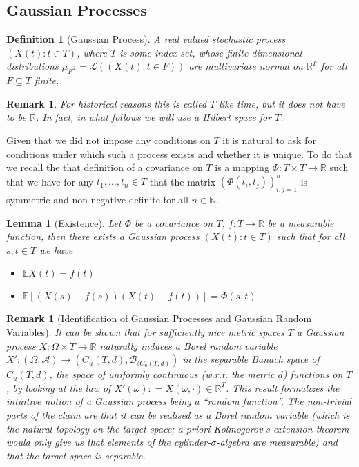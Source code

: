 \documentclass[11pt,reqno]{amsart}
\numberwithin{equation}{section}
\newtheorem{lem}[thm]{Lemma}
\newtheorem{defi}[thm]{Definition}
\newtheorem{rem}[thm]{Remark}
\newcommand{\deq}{\mathrel{\mathop:}=}
\begin{document}
\subsection{Gaussian Processes}

\begin{defi}[Gaussian Process]
	A real valued stochastic process $(X(t):t\in T)$, where $T$ is some index set, whose finite dimensional distributions $\mu_F\deq \mathcal L((X(t):t\in F))$ are multivariate normal on $\mathbb R^F$ for all $F\subseteq T$ finite.
\end{defi}

\begin{rem}
	For historical reasons this is called $T$ like time, but it does not have to be $\mathbb R$. In fact, in what follows we will use a Hilbert space for $T$.
\end{rem}

Given that we did not impose any conditions on $T$ it is natural to ask for conditions under which such a process exists and whether it is unique. To do that we recall the that definition of a covariance on $T$ is a mapping $\Phi:T\times T\rightarrow\mathbb R$ such that we have for any $t_1,\dots, t_n\in T$ that the matrix $(\Phi(t_i,t_j))_{i,j=1}^n$ is symmetric and non-negative definite for all $n\in\mathbb N$.

\begin{lem}[Existence]\label{lem:existenceofGPgivenCov}
	Let $\Phi$ be a covariance on $T$, $f:T\rightarrow\mathbb R$ be a measurable function, then there exists a Gaussian process $(X(t):t\in T)$ such that for all $s,t\in T$ we have
	\begin{itemize}
		\item $\mathbb E X(t) = f(t)$
		\item $\mathbb E[(X(s)-f(s))(X(t)-f(t))]=\Phi(s,t)$
	\end{itemize}
\end{lem}


\begin{rem}[Identification of Gaussian Processes and Gaussian Random Variables]\label{rem:GPandGrvs}
	It can be shown that for sufficiently nice metric spaces $T$ a Gaussian process $X:\Omega\times T\rightarrow\mathbb R$ naturally induces a Borel random variable $X':(\Omega,\mathcal A)\rightarrow (C_u(T,d),\mathcal B_{(C_u(T,d)})$ in the separable Banach space of $C_u(T,d)$, the space of uniformly continuous (w.r.t. the metric $d$) functions on $T$, by looking at the law of $X'(\omega)\deq X(\omega,\cdot)\in\mathbb R^T$.
	This result formalizes the intuitive notion of a Gaussian process being a ``random function''. The non-trivial parts of the claim are that it can be realised as a \emph{Borel} random variable (which is the natural topology on the target space; a priori Kolmogorov's extension theorem would only give us that elements of the cylinder-$\sigma$-algebra are measurable) and that the target space is \emph{separable}.
\end{rem}
\end{document}
